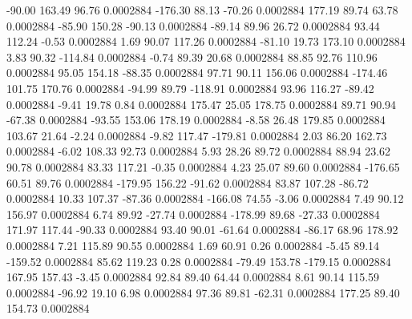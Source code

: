       -90.00      163.49       96.76     0.0002884
     -176.30       88.13      -70.26     0.0002884
      177.19       89.74       63.78     0.0002884
      -85.90      150.28      -90.13     0.0002884
      -89.14       89.96       26.72     0.0002884
       93.44      112.24       -0.53     0.0002884
        1.69       90.07      117.26     0.0002884
      -81.10       19.73      173.10     0.0002884
        3.83       90.32     -114.84     0.0002884
       -0.74       89.39       20.68     0.0002884
       88.85       92.76      110.96     0.0002884
       95.05      154.18      -88.35     0.0002884
       97.71       90.11      156.06     0.0002884
     -174.46      101.75      170.76     0.0002884
      -94.99       89.79     -118.91     0.0002884
       93.96      116.27      -89.42     0.0002884
       -9.41       19.78        0.84     0.0002884
      175.47       25.05      178.75     0.0002884
       89.71       90.94      -67.38     0.0002884
      -93.55      153.06      178.19     0.0002884
       -8.58       26.48      179.85     0.0002884
      103.67       21.64       -2.24     0.0002884
       -9.82      117.47     -179.81     0.0002884
        2.03       86.20      162.73     0.0002884
       -6.02      108.33       92.73     0.0002884
        5.93       28.26       89.72     0.0002884
       88.94       23.62       90.78     0.0002884
       83.33      117.21       -0.35     0.0002884
        4.23       25.07       89.60     0.0002884
     -176.65       60.51       89.76     0.0002884
     -179.95      156.22      -91.62     0.0002884
       83.87      107.28      -86.72     0.0002884
       10.33      107.37      -87.36     0.0002884
     -166.08       74.55       -3.06     0.0002884
        7.49       90.12      156.97     0.0002884
        6.74       89.92      -27.74     0.0002884
     -178.99       89.68      -27.33     0.0002884
      171.97      117.44      -90.33     0.0002884
       93.40       90.01      -61.64     0.0002884
      -86.17       68.96      178.92     0.0002884
        7.21      115.89       90.55     0.0002884
        1.69       60.91        0.26     0.0002884
       -5.45       89.14     -159.52     0.0002884
       85.62      119.23        0.28     0.0002884
      -79.49      153.78     -179.15     0.0002884
      167.95      157.43       -3.45     0.0002884
       92.84       89.40       64.44     0.0002884
        8.61       90.14      115.59     0.0002884
      -96.92       19.10        6.98     0.0002884
       97.36       89.81      -62.31     0.0002884
      177.25       89.40      154.73     0.0002884
